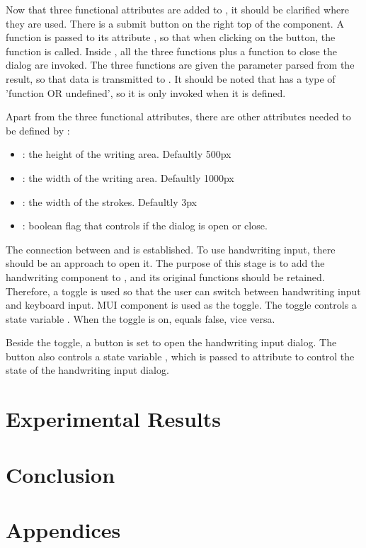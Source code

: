 \documentclass[12pt,twoside]{report}
\begin{document}
Now that three functional attributes are added to , it
should be clarified where they are used. There is a submit button on the right
top of the component. A function  is passed to its attribute
, so that when clicking on the button, the function is called.
Inside , all the three functions plus a function to close the
dialog are invoked. The three functions are given the parameter
 parsed from the result, so that data is transmitted to
. It should be noted that  has a type
of 'function OR undefined', so it is only invoked when it is defined.

Apart from the three functional attributes, there are other attributes needed to be defined by :
\begin{itemize}
    \item {}: the height of the writing area. Defaultly 500px
    \item {}: the width of the writing area. Defaultly 1000px
    \item {}: the width of the strokes. Defaultly 3px
    \item {}: boolean flag that controls if the dialog is open or close.
\end{itemize}

The connection between  and  is
established. To use handwriting input, there should be an approach to open it.
The purpose of this stage is to add the handwriting component to
, and its original functions should be retained.
Therefore, a toggle is used so that the user can switch between handwriting
input and keyboard input. MUI component  is used as the toggle. The toggle controls a state variable . When the toggle is on,  equals false, vice versa.

Beside the toggle, a button is set to open the handwriting input dialog. The
button also controls a state variable , which is passed to
attribute  to control the state of the handwriting input dialog.


\chapter{Experimental Results}
\label{Results}


\chapter{Conclusion}
\label{Conclusion}





\chapter{Appendices}
\label{Appendices}
\end{document}
